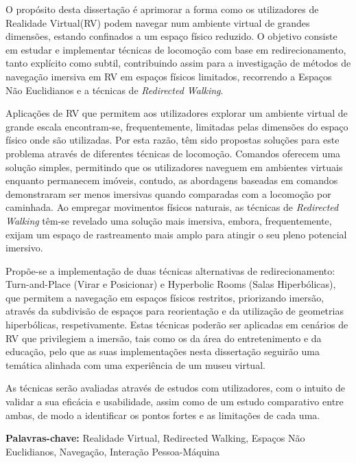 
%

O propósito desta dissertação é aprimorar a forma como os utilizadores de Realidade Virtual(RV) podem navegar num ambiente virtual de grandes dimensões, estando confinados a um espaço físico reduzido.
O objetivo consiste em estudar e implementar técnicas de locomoção com base em redirecionamento, tanto explícito como subtil, contribuindo assim para a investigação
de métodos de navegação imersiva em RV em espaços físicos limitados, recorrendo a Espaços Não Euclidianos e a técnicas de \textit{Redirected Walking}.

Aplicações de RV que permitem aos utilizadores explorar um ambiente virtual de grande escala encontram-se, frequentemente, 
limitadas pelas dimensões do espaço físico onde são utilizadas.
Por esta razão, têm sido propostas soluções para este problema através de diferentes técnicas de locomoção. Comandos oferecem
uma solução simples, permitindo que os utilizadores naveguem em ambientes virtuais enquanto permanecem imóveis,
contudo, as abordagens baseadas em comandos demonstraram ser menos imersivas quando comparadas com a locomoção por caminhada.
Ao empregar movimentos físicos naturais, as técnicas de \textit{Redirected Walking} têm-se revelado uma solução mais imersiva,
embora, frequentemente, exijam um espaço de rastreamento mais amplo para atingir o seu pleno potencial imersivo.

Propõe-se a implementação de duas técnicas alternativas de redirecionamento: Turn-and-Place (Virar e Posicionar) e 
Hyperbolic Rooms (Salas Hiperbólicas), que permitem a navegação em espaços físicos restritos, priorizando imersão,
através da subdivisão de espaços para reorientação e da utilização de geometrias hiperbólicas, respetivamente.
Estas técnicas poderão ser aplicadas em cenários de RV que privilegiem a imersão, tais como os da área do entretenimento e da educação, pelo que
as suas implementações nesta dissertação seguirão uma temática alinhada com uma experiência de um museu virtual.

As técnicas serão avaliadas através de estudos com utilizadores, com o intuito de validar a sua eficácia e usabilidade, 
assim como de um estudo comparativo entre ambas, de modo a identificar os pontos fortes e as limitações de cada uma.

\textbf{Palavras-chave:} Realidade Virtual, Redirected Walking, Espaços Não Euclidianos, Navegação, Interação Pessoa-Máquina